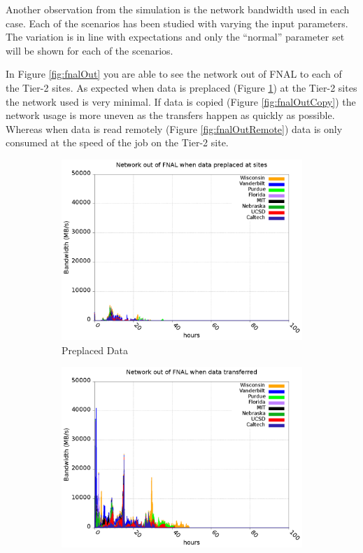 \documentclass[a4paper]{jpconf}
\begin{document}
Another observation from the simulation is the network bandwidth used
in each case. Each of the scenarios has been studied with varying the
input parameters. The variation is in line with expectations and only
the ``normal'' parameter set will be shown for each of the scenarios.

In Figure \ref{fig:fnalOut} you are able to see the network out of
FNAL to each of the Tier-2 sites. As expected when data is preplaced
(Figure \ref{fig:fnalOutToday}) at the Tier-2 sites the network used
is very minimal. If data is copied (Figure \ref{fig:fnalOutCopy}) the
network usage is more uneven as the transfers happen as quickly as
possible. Whereas when data is read remotely (Figure
\ref{fig:fnalOutRemote}) data is only consumed at the speed of the job
on the Tier-2 site.

\begin{figure}
  \centering
  \begin{subfigure}{0.3\textwidth}
    \includegraphics[width=\textwidth]{figures/T_FP0_RP0Data.png}
    \caption{Preplaced Data\label{fig:fnalOutToday}}
  \end{subfigure}
  \begin{subfigure}{0.3\textwidth}
    \includegraphics[width=\textwidth]{figures/S_FP0_RP0Data.png}

\end{subfigure}
\end{figure}
\end{document}
